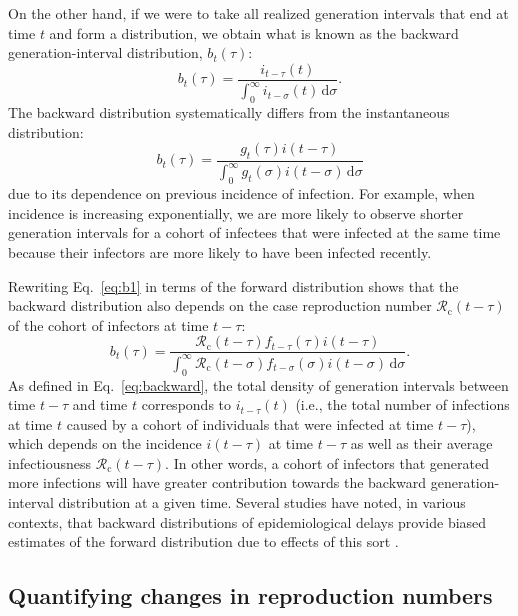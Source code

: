 \documentclass[12pt]{article}
\newcommand{\eref}[1]{Eq.~\ref{eq:#1}}
\newcommand{\Rx}[1]{\ensuremath{{\mathcal R}_{#1}}\xspace}
\newcommand{\Rc}{\Rx{\mathrm{c}}}
\newcommand{\dd}[1]{\ensuremath{\, \mathrm{d}#1}}
\newcommand{\dsigma}{\dd{\sigma}}
\begin{document}
On the other hand, if we were to take all realized generation intervals that end at time $t$ and form a distribution, we obtain what is known as the backward generation-interval distribution, $b_t(\tau)$:
\begin{equation}
b_t(\tau) = \frac{i_{t-\tau}(t)}{\int_0^\infty i_{t-\sigma}(t) \dsigma}.
\label{eq:backward}
\end{equation}
The backward distribution systematically differs from the instantaneous distribution:
\begin{equation}
b_t(\tau) = \frac{g_t(\tau) i(t-\tau)}{\int_0^\infty g_t(\sigma) i(t-\sigma) \dsigma}
\label{eq:b1}
\end{equation}
due to its dependence on previous incidence of infection.
For example, when incidence is increasing exponentially, we are more likely to observe shorter generation intervals for a cohort of infectees that were infected at the same time because their infectors are more likely to have been infected recently.

Rewriting \eref{b1} in terms of the forward distribution shows that the backward distribution also depends on the case reproduction number $\Rc(t-\tau)$ of the cohort of infectors at time $t-\tau$:
\begin{equation}
b_t(\tau) = \frac{\Rc(t-\tau) f_{t-\tau}(\tau) i(t-\tau)}{\int_0^\infty \Rc(t-\sigma) f_{t-\sigma}(\sigma) i(t-\sigma) \dsigma}.
\label{eq:b2}
\end{equation}
As defined in \eref{backward}, the total density of generation intervals between time $t-\tau$ and time $t$ corresponds to $i_{t-\tau}(t)$ (i.e., the total number of infections at time $t$ caused by a cohort of individuals that were infected at time $t-\tau$), which depends on the incidence $i(t-\tau)$ at time $t-\tau$ as well as their average infectiousness $\Rc(t-\tau)$.
In other words, a cohort of infectors that generated more infections will have greater contribution towards the backward generation-interval distribution at a given time.
Several studies have noted, in various contexts, that backward distributions of epidemiological delays provide biased estimates of the forward distribution due to effects of this sort \citep{nishiura2010time,champredon2015intrinsic,park2020inferring,park2020forward}.

\subsection{Quantifying changes in reproduction numbers}
\end{document}
